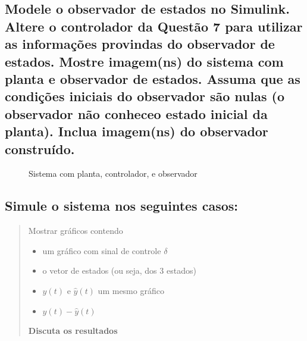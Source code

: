 \documentclass[13pt]{article}
\begin{document}
    \hypertarget{modele-o-observador-de-estados-no-simulink.-altere-o-controlador-da-questuxe3o-7-para-utilizar-as-informauxe7uxf5es-provindas-do-observador-de-estados.-mostre-imagemns-do-sistema-com-planta-e-observador-de-estados.-assuma-que-as-condiuxe7uxf5es-iniciais-do-observador-suxe3o-nulas-o-observador-nuxe3o-conheceo-estado-inicial-da-planta.-inclua-imagemns-do-observador-construuxeddo.}{%
\subsection{Modele o observador de estados no Simulink. Altere o
controlador da Questão 7 para utilizar as informações provindas do
observador de estados. Mostre imagem(ns) do sistema com planta e
observador de estados. Assuma que as condições iniciais do observador
são nulas (o observador não conheceo estado inicial da planta). Inclua
imagem(ns) do observador
construído.}\label{modele-o-observador-de-estados-no-simulink.-altere-o-controlador-da-questuxe3o-7-para-utilizar-as-informauxe7uxf5es-provindas-do-observador-de-estados.-mostre-imagemns-do-sistema-com-planta-e-observador-de-estados.-assuma-que-as-condiuxe7uxf5es-iniciais-do-observador-suxe3o-nulas-o-observador-nuxe3o-conheceo-estado-inicial-da-planta.-inclua-imagemns-do-observador-construuxeddo.}}

    \begin{figure}[H]
\centering

\caption{Sistema com planta, controlador, e observador}
\end{figure}

    \hypertarget{simule-o-sistema-nos-seguintes-casos}{%
\subsection{Simule o sistema nos seguintes
casos:}\label{simule-o-sistema-nos-seguintes-casos}}

\begin{quote}
Mostrar gráficos contendo
\begin{itemize}
\item um gráfico com sinal de controle \(\delta\)
\item o vetor de estados (ou seja, dos 3 estados)
\item \(y(t)\) e \(\hat{y}(t)\) um mesmo gráfico
\item \(y(t) - \hat{y}(t)\)
\end{itemize}

\textbf{Discuta os resultados}
\end{quote}
\end{document}
